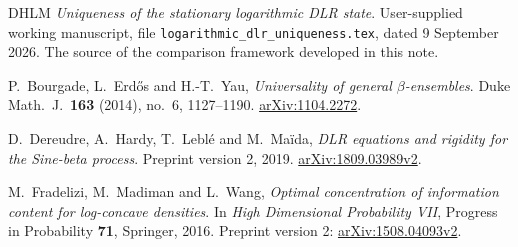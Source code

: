 \documentclass[11pt,reqno]{amsart}
\numberwithin{equation}{section}
\theoremstyle{definition}
\newcommand{\1}{\mathbf 1}
\begin{document}
\begin{thebibliography}{DHLM}
\emph{Uniqueness of the stationary logarithmic DLR state}.
User-supplied working manuscript, file
\texttt{logarithmic\_dlr\_uniqueness.tex}, dated 9 September 2026.
The source of the comparison framework developed in this note.

P.~Bourgade, L.~Erd\H{o}s and H.-T.~Yau,
\emph{Universality of general $\beta$-ensembles}.
Duke Math.\ J.\ \textbf{163} (2014), no.~6, 1127--1190.
\href{https://arxiv.org/abs/1104.2272}{arXiv:1104.2272}.

D.~Dereudre, A.~Hardy, T.~Lebl\'e and M.~Ma\"ida,
\emph{DLR equations and rigidity for the Sine-beta process}.
Preprint version 2, 2019.
\href{https://arxiv.org/abs/1809.03989v2}{arXiv:1809.03989v2}.

M.~Fradelizi, M.~Madiman and L.~Wang,
\emph{Optimal concentration of information content for log-concave
densities}.
In \emph{High Dimensional Probability VII}, Progress in Probability
\textbf{71}, Springer, 2016.
Preprint version 2:
\href{https://arxiv.org/abs/1508.04093v2}{arXiv:1508.04093v2}.
\end{thebibliography}
\end{document}
